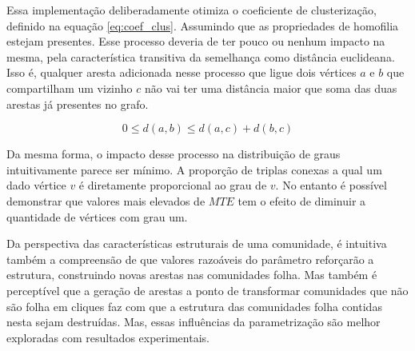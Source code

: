 \documentclass[notes.tex]{subfiles}
\begin{document}
Essa implementação deliberadamente otimiza o coeficiente de clusterização, definido na equação \ref{eq:coef_clus}.
Assumindo que as propriedades de homofilia estejam presentes.
Esse processo deveria de ter pouco ou nenhum impacto na mesma, pela característica transitiva da semelhança como distância euclideana.
Isso é, qualquer aresta adicionada nesse processo que ligue dois vértices  $a$ e  $b$ que compartilham um vizinho  $c$ não vai ter uma distância maior que soma das duas arestas já presentes no grafo.

\begin{equation}
0 \le d(a, b) \le d(a, c) + d(b, c)
\end{equation}

Da mesma forma, o impacto desse processo na distribuição de graus intuitivamente parece ser mínimo.
A proporção de triplas conexas a qual um dado vértice $v$ é diretamente proporcional ao grau de $v$. 
No entanto é possível demonstrar que valores mais elevados de $MTE$ tem o efeito de diminuir a quantidade de vértices com grau um.

Da perspectiva das características estruturais de uma comunidade, é intuitiva também a compreensão de que valores razoáveis do parâmetro reforçarão a estrutura, construindo novas arestas nas comunidades folha.
Mas também é perceptível que a geração de arestas a ponto de transformar comunidades que não são folha em cliques faz com que a estrutura das comunidades folha contidas nesta sejam destruídas.
Mas, essas influências da parametrização são melhor exploradas com resultados experimentais.
\end{document}
